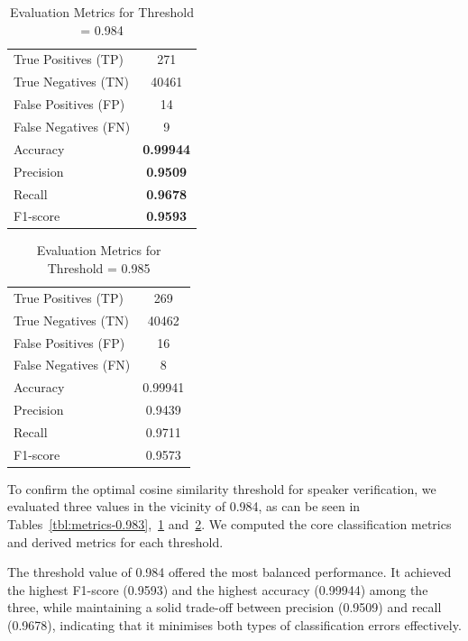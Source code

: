 \documentclass[conference]{IEEEtran}
\begin{document}
	\begin{table}[ht]
		\centering
		\begin{tabular}{|l|c|}
			\hline
			True Positives (TP) & 271 \\
			True Negatives (TN) & 40461 \\
			False Positives (FP) & 14 \\
			False Negatives (FN) & 9 \\
			Accuracy            & \textbf{0.99944} \\
			Precision           & \textbf{0.9509} \\
			Recall              & \textbf{0.9678} \\
			F1-score            & \textbf{0.9593} \\
			\hline
		\end{tabular}
		\caption{Evaluation Metrics for Threshold = 0.984}
		\label{tbl:metrics-0.984}
	\end{table}
	
	\begin{table}[ht]
		\centering
		\begin{tabular}{|l|c|}
			\hline
			True Positives (TP) & 269 \\
			True Negatives (TN) & 40462 \\
			False Positives (FP) & 16 \\
			False Negatives (FN) & 8 \\
			Accuracy            & 0.99941 \\
			Precision           & 0.9439 \\
			Recall              & 0.9711 \\
			F1-score            & 0.9573 \\
			\hline
		\end{tabular}
		\caption{Evaluation Metrics for Threshold = 0.985}
		\label{tbl:metrics-0.985}
	\end{table}


	To confirm the optimal cosine similarity threshold for speaker verification, we evaluated three values in the vicinity of 0.984, as can be seen in Tables~\ref{tbl:metrics-0.983},~\ref{tbl:metrics-0.984} and~\ref{tbl:metrics-0.985}. We computed the core classification metrics and derived metrics for each threshold.
	
	The threshold value of 0.984 offered the most balanced performance. It achieved the highest F1-score (0.9593) and the highest accuracy (0.99944) among the three, while maintaining a solid trade-off between precision (0.9509) and recall (0.9678), indicating that it minimises both types of classification errors effectively.
	
\end{document}
